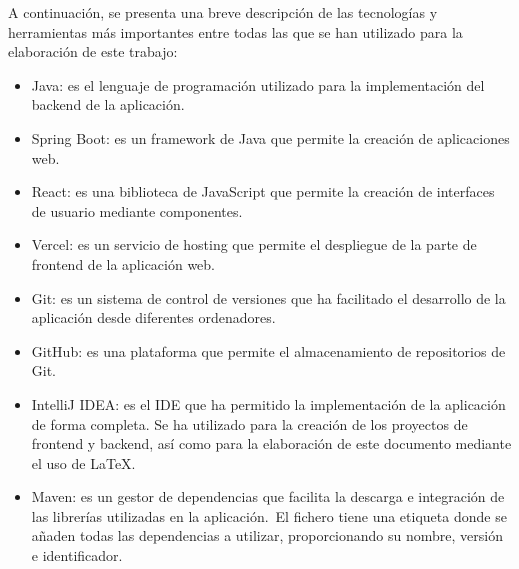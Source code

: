 A continuación, se presenta una breve descripción de las tecnologías y herramientas más importantes entre todas las que
se han utilizado para la elaboración de este trabajo:

\begin{itemize}
	\item Java: es el lenguaje de programación utilizado para la implementación del backend de la aplicación.
	\item Spring Boot: es un framework de Java que permite la creación de aplicaciones web.
	\item React: es una biblioteca de JavaScript que permite la creación de interfaces de usuario mediante componentes.
	\item Vercel: es un servicio de hosting que permite el despliegue de la parte de frontend de la aplicación web.
	\item Git: es un sistema de control de versiones que ha facilitado el desarrollo de la aplicación desde diferentes
	ordenadores.
	\item GitHub: es una plataforma que permite el almacenamiento de repositorios de Git.
	\item IntelliJ IDEA: es el IDE que ha permitido la implementación de la aplicación de forma completa.
	Se ha utilizado para la creación de los proyectos de frontend y backend, así como para la
	elaboración de este documento mediante el uso de \LaTeX.
	\item Maven: es un gestor de dependencias que facilita la descarga e integración de las librerías utilizadas en la
	aplicación.\ El fichero  tiene una etiqueta donde se añaden todas las dependencias a utilizar,
	proporcionando su nombre, versión e identificador.
\end{itemize}
